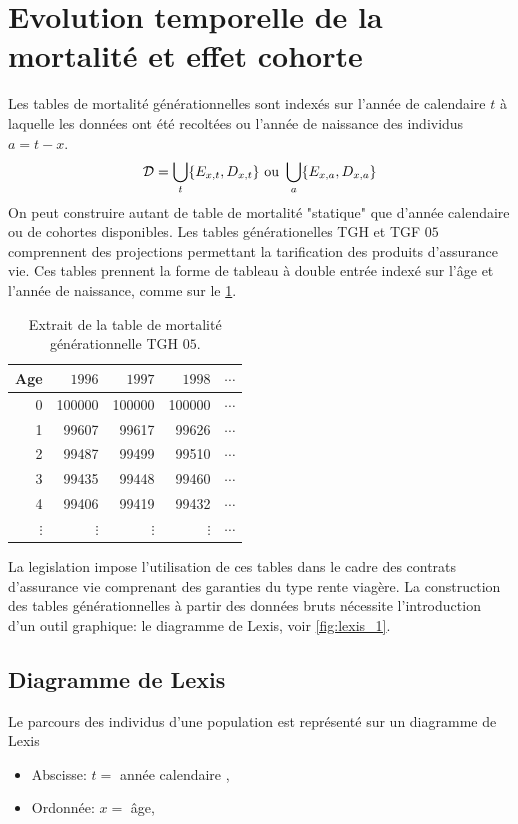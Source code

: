 \section{Evolution temporelle de la mortalité et effet cohorte}
Les tables de mortalité générationnelles sont indexés sur l'année de calendaire $t$ à laquelle les données ont été recoltées ou l'année de naissance des individus $a= t-x$.
$$
\mathcal{D} =  \bigcup_{t} \{E_{x,t}, D_{x,t}\}\text{ ou } \bigcup_{a} \{E_{x,a},D_{x,a}\}
$$
On peut construire autant de table de mortalité "statique" que d'année calendaire ou de cohortes disponibles. Les tables générationelles TGH et TGF $05$ comprennent des projections permettant la tarification des produits d'assurance vie. Ces tables prennent la forme de tableau à double entrée indexé sur l'âge et l'année de naissance, comme sur le \cref{tab:TGH05}.
\begin{table}[ht!]
\centering
\begin{tabular}{rrrrr}
  \hline
  Age & $1996$ & $1997$ & $1998$ &$\cdots$\\ 
  \hline
0 & 100000 & 100000 & 100000&$\cdots$ \\ 
 1 & 99607 & 99617 & 99626 &$\cdots$\\ 
 2 & 99487 & 99499 & 99510&$\cdots$ \\ 
 3 & 99435 & 99448 & 99460&$\cdots$ \\ 
 4 & 99406 & 99419 & 99432&$\cdots$ \\ 
$\vdots$ & $\vdots$ & $\vdots$ & $\vdots$&$\cdots$ \\ 
   \hline
\end{tabular}
\caption{Extrait de la table de mortalité générationnelle TGH $05$.}
\label{tab:TGH05}
\end{table}
La legislation impose l'utilisation de ces tables dans le cadre des contrats d'assurance vie comprenant des garanties du type rente viagère. 
La construction des tables générationnelles à partir des données bruts nécessite l'introduction d'un outil graphique: le diagramme de Lexis, voir \cref{fig:lexis_1}.
\subsection{Diagramme de Lexis}
Le parcours des individus d'une population est représenté sur un diagramme de Lexis 
\begin{itemize}
\item Abscisse: $t = $ année calendaire ,
\item Ordonnée: $x=$ âge,
\end{itemize}

